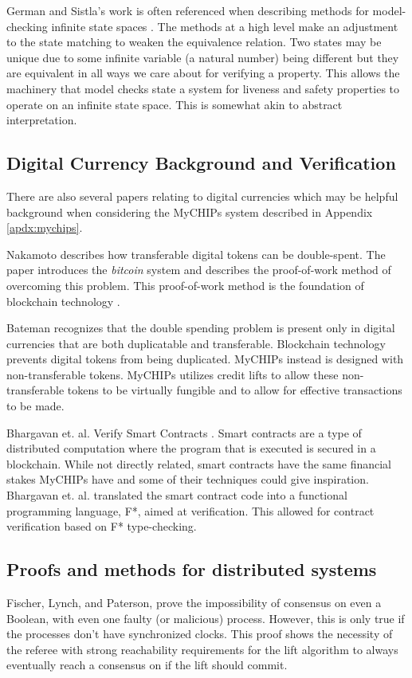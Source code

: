 \documentclass[runningheads]{llncs}
\begin{document}
German and Sistla's work is often referenced when describing methods for model-checking infinite state spaces \cite{component_language}\cite{lowe_parameterized}\cite{view_abstraction}. The methods at a high level make an adjustment to the state matching to weaken the equivalence relation. Two states may be unique due to some infinite variable (a natural number) being different but they are equivalent in all ways we care about for verifying a property. This allows the machinery that model checks state a system for liveness and safety properties to operate on an infinite state space. This is somewhat akin to abstract interpretation. 

\subsection{Digital Currency Background and Verification}
There are also several papers relating to digital currencies which may be helpful background when considering the MyCHIPs system described in Appendix \ref{apdx:mychips}.

 Nakamoto describes how transferable digital tokens can be double-spent. The paper introduces the \emph{bitcoin} system and describes the proof-of-work method of overcoming this problem. This proof-of-work method is the foundation of blockchain technology \cite{bitcoin}.

 Bateman recognizes that the double spending problem is present only in digital currencies that are both duplicatable and transferable. Blockchain technology prevents digital tokens from being duplicated. MyCHIPs instead is designed with non-transferable tokens. MyCHIPs utilizes credit lifts to allow these non-transferable tokens to be virtually fungible and to allow for effective transactions to be made. 
 
 Bhargavan et. al. Verify Smart Contracts \cite{SmartContracts}. Smart contracts are a type of distributed computation where the program that is executed is secured in a blockchain. While not directly related, smart contracts have the same financial stakes MyCHIPs have and some of their techniques could give inspiration.  Bhargavan et. al. translated the smart contract code into a functional programming language, F*, aimed at verification. This allowed for contract verification based on F* type-checking.

 \subsection{Proofs and methods for distributed systems}
 Fischer, Lynch, and Paterson\cite{Fischer}, prove the impossibility of consensus on even a Boolean, with even one faulty (or malicious) process. However, this is only true if the processes don't have synchronized clocks. This proof shows the necessity of the referee with strong reachability requirements for the lift algorithm to always eventually reach a consensus on if the lift should commit.
 
\end{document}
